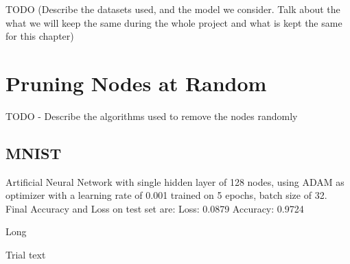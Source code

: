 \documentclass[UKenglish]{ifimaster}
\begin{document}
    TODO (Describe the datasets used, and the model we consider. Talk about the what we will keep the same during the whole project and what
    is kept the same for this chapter)
    \section{Pruning Nodes at Random}
        TODO - Describe the algorithms used to remove the nodes randomly

        \begin{algorithm}
            \SetStartEndCondition{ }{}{}%
            \renewcommand{\forcond}{$i$ \KwTo\Range{$n$}}
            \AlgoDontDisplayBlockMarkers\SetAlgoNoEnd\SetAlgoNoLine%
        \end{algorithm}

        \subsection{MNIST}
            Artificial Neural Network with single hidden layer of 128 nodes, using ADAM as optimizer with a learning rate of 0.001 trained on 5 epochs, batch size of 32.
            Final Accuracy and Loss on test set are:
            Loss: 0.0879
            Accuracy: 0.9724

            \begin{table}[h!]
                \centering
                \resizebox{\textwidth}{!}{}
                \caption[Short]{Long}
                \label{tab:ac_rnd_rem_mnist}
            \end{table}

            Trial text
\end{document}
